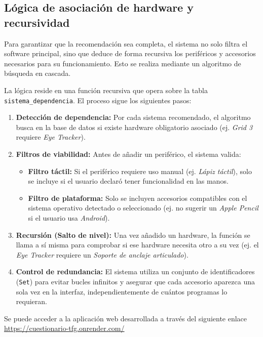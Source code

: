 \subsection{Lógica de asociación de hardware y recursividad}
Para garantizar que la recomendación sea completa, el sistema no solo filtra el software principal, sino que deduce de forma recursiva los periféricos y accesorios necesarios para su funcionamiento. Esto se realiza mediante un algoritmo de búsqueda en cascada.

La lógica reside en una función recursiva que opera sobre la tabla \texttt{sistema\_dependencia}. El proceso sigue los siguientes pasos:
\begin{enumerate}
    \item \textbf{Detección de dependencia:} Por cada sistema recomendado, el algoritmo busca en la base de datos si existe hardware obligatorio asociado (ej. \textit{Grid 3} requiere \textit{Eye Tracker}).
    \item \textbf{Filtros de viabilidad:} Antes de añadir un periférico, el sistema valida:
    \begin{itemize}
        \item \textbf{Filtro táctil:} Si el periférico requiere uso manual (ej. \textit{Lápiz táctil}), solo se incluye si el usuario declaró tener funcionalidad en las manos.
        \item \textbf{Filtro de plataforma:} Solo se incluyen accesorios compatibles con el sistema operativo detectado o seleccionado (ej. no sugerir un \textit{Apple Pencil} si el usuario usa \textit{Android}).
    \end{itemize}
    \item \textbf{Recursión (Salto de nivel):} Una vez añadido un hardware, la función se llama a sí misma para comprobar si ese hardware necesita otro a su vez (ej. el \textit{Eye Tracker} requiere un \textit{Soporte de anclaje articulado}).
    \item \textbf{Control de redundancia:} El sistema utiliza un conjunto de identificadores (\texttt{Set}) para evitar bucles infinitos y asegurar que cada accesorio aparezca una sola vez en la interfaz, independientemente de cuántos programas lo requieran.
\end{enumerate}


Se puede acceder a la aplicación web desarrollada a través del siguiente enlace \url{https://cuestionario-tfg.onrender.com/}